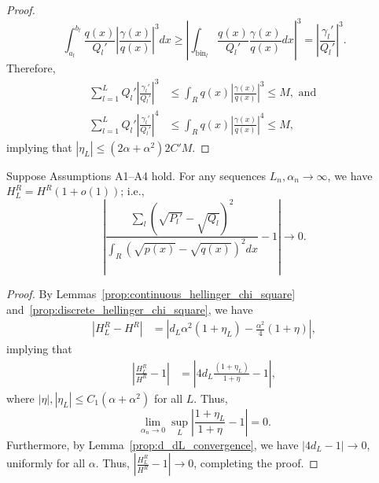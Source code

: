 \documentclass{article}
\newcommand{\bin}{\text{bin}}
\begin{document}
\begin{proof}
\[
\int_{a_l}^{b_l} \frac{q(x)}{Q_l'} \left| \frac{\gamma(x)}{q(x)} \right|^3 dx \geq
 \left| \int_{\bin_l} \frac{q(x)}{Q_l'} \frac{\gamma(x)}{q(x)} dx \right|^3 =
 \left| \frac{\gamma_l'}{Q_l'} \right|^3.
\]
Therefore,
\begin{align*}
\sum_{l=1}^L Q_l' \left| \frac{\gamma_l'}{Q_l'} \right|^3 &\leq \int_R q(x) \left| \frac{\gamma(x)}{q(x)} \right|^3 \leq M,  \text{ and }\\
\sum_{l=1}^L Q_l' \left| \frac{\gamma_l'}{Q_l'} \right|^4 &\leq \int_R q(x) \left| \frac{\gamma(x)}{q(x)} \right|^4 \leq M,
\end{align*}
implying that $|\eta_L| \leq (2 \alpha + \alpha^2) 2 C' M$.
\end{proof}






\begin{lemma}
\label{prop:H_HL_convergence_R}
Suppose Assumptions A1--A4 hold. For any sequences $L_n, \alpha_n \rightarrow \infty$, we have $H^R_L = H^R(1+o(1))$; i.e.,
\[
\left| \frac{\sum_l (\sqrt{P_l'} - \sqrt{Q_l})^2}{\int_R (\sqrt{p(x)} - \sqrt{q(x)})^2 dx} 
        - 1 \right| \rightarrow 0.
\]

\end{lemma}

\begin{proof}
By Lemmas~\ref{prop:continuous_hellinger_chi_square} and~\ref{prop:discrete_hellinger_chi_square}, we have
\begin{align*}
| H^R_L - H^R | & = \left| d_L \alpha^2 ( 1 + \eta_L) -  \frac{\alpha^2}{4} ( 1 + \eta) \right|,
 \end{align*}
implying that
\begin{align*}
\left| \frac{H^R_L}{H^R} - 1 \right| &= \left |4d_L \frac{(1+\eta_L)}{1 + \eta} - 1 \right|,
\end{align*}
where $|\eta|, |\eta_L| \leq C_1(\alpha + \alpha^2)$ for all $L$. Thus,
\[
\lim_{\alpha_n \rightarrow 0} \sup_L \left| \frac{1+\eta_L}{1+\eta} - 1 \right| = 0.
\]
Furthermore, by Lemma~\ref{prop:d_dL_convergence}, we have $|4d_L - 1| \rightarrow 0$,
uniformly for all $\alpha$. Thus, $\left| \frac{H^R_L}{H^R} - 1 \right| \to 0$, completing the proof.
\end{proof}

\end{document}
